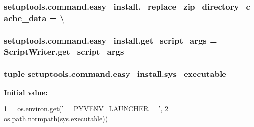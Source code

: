 \subsubsection[{\+\_\+replace\+\_\+zip\+\_\+directory\+\_\+cache\+\_\+data}]{\setlength{\rightskip}{0pt plus 5cm}setuptools.\+command.\+easy\+\_\+install.\+\_\+replace\+\_\+zip\+\_\+directory\+\_\+cache\+\_\+data = \textbackslash{}}\label{namespacesetuptools_1_1command_1_1easy__install_aa9f7d6a38e2d4a1ad18d11a1e978de2b}
\hypertarget{namespacesetuptools_1_1command_1_1easy__install_a267b9ab1d7874774429df54a3da6ad66}{}
\subsubsection[{get\+\_\+script\+\_\+args}]{\setlength{\rightskip}{0pt plus 5cm}setuptools.\+command.\+easy\+\_\+install.\+get\+\_\+script\+\_\+args = Script\+Writer.\+get\+\_\+script\+\_\+args}\label{namespacesetuptools_1_1command_1_1easy__install_a267b9ab1d7874774429df54a3da6ad66}
\hypertarget{namespacesetuptools_1_1command_1_1easy__install_afc291a499906d82a7192ea88ae25f2a9}{}
\subsubsection[{sys\+\_\+executable}]{\setlength{\rightskip}{0pt plus 5cm}tuple setuptools.\+command.\+easy\+\_\+install.\+sys\+\_\+executable}\label{namespacesetuptools_1_1command_1_1easy__install_afc291a499906d82a7192ea88ae25f2a9}
{\bfseries Initial value\+:}
\begin{DoxyCode}
1 = os.environ.get(\textcolor{stringliteral}{'\_\_PYVENV\_LAUNCHER\_\_'},
2                                 os.path.normpath(sys.executable))
\end{DoxyCode}
